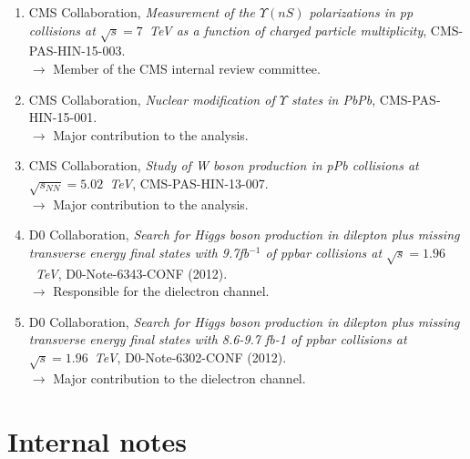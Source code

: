 \documentclass[a4paper,11pt]{article}
\begin{document}
 \begin{enumerate}
 \item CMS Collaboration, \emph{Measurement of the $\Upsilon(nS)$ polarizations in pp collisions at $\sqrt{s} =7$~TeV as a function of charged particle multiplicity},
 CMS-PAS-HIN-15-003.\\
 \hspace{5pt} $\to$ Member of the CMS internal review committee.
  \item CMS Collaboration, \emph{Nuclear modification of $\Upsilon$ states in PbPb}, CMS-PAS-HIN-15-001.\\
  \hspace{5pt} $\to$ Major contribution to the analysis.
  \item CMS Collaboration, \emph{Study of W boson production in pPb collisions at $\sqrt{s_{NN}} = 5.02$~TeV}, CMS-PAS-HIN-13-007.\\
  \hspace{5pt} $\to$ Major contribution to the analysis.
\item D0 Collaboration, \emph{Search for Higgs boson production in dilepton plus missing transverse energy final states with 
9.7fb$^{-1}$ of ppbar collisions at $\sqrt{s} =1.96$~TeV}, D0-Note-6343-CONF (2012).\\
\hspace{5pt} $\to$ Responsible for the dielectron channel.
\item D0 Collaboration, 
\emph{Search for Higgs boson production in dilepton plus missing transverse energy final states with 8.6-9.7 fb-1 of ppbar 
collisions at $\sqrt{s}=1.96$~TeV}, D0-Note-6302-CONF (2012).\\
\hspace{5pt} $\to$ Major contribution to the dielectron channel.
 \end{enumerate}
 
 \section*{Internal notes}
 
\end{document}
